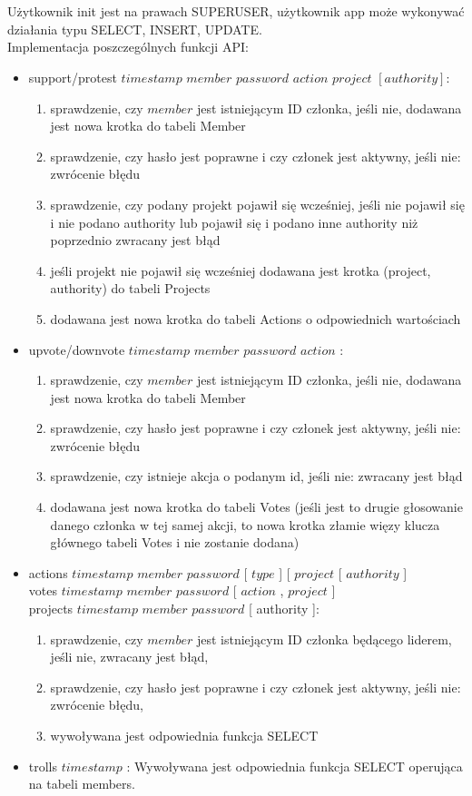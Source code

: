 \documentclass[12pt]{article}
\begin{document}
\\\\ Użytkownik init jest na prawach SUPERUSER, użytkownik app może wykonywać działania typu SELECT, INSERT, UPDATE.
\\Implementacja poszczególnych funkcji API:
\begin{itemize}
\item support/protest  $ timestamp$ $ member$ $ password$ $ action $ $project $ $[authority] $: \begin{enumerate}
\item sprawdzenie, czy  $member $  jest istniejącym ID członka, jeśli nie, dodawana jest nowa krotka do tabeli Member
\item sprawdzenie, czy hasło jest poprawne i czy członek jest aktywny, jeśli nie: zwrócenie błędu
\item sprawdzenie, czy podany projekt pojawił się wcześniej, jeśli nie pojawił się i nie podano authority lub pojawił się i podano inne authority niż poprzednio zwracany jest błąd
\item jeśli projekt nie pojawił się wcześniej dodawana jest krotka (project, authority) do tabeli Projects
\item dodawana jest nowa krotka do tabeli Actions o odpowiednich wartościach
\end{enumerate}
\item upvote/downvote  $timestamp $   $member $   $password $   $action $  :
\begin{enumerate}
\item sprawdzenie, czy  $member $  jest istniejącym ID członka, jeśli nie, dodawana jest nowa krotka do tabeli Member
\item sprawdzenie, czy hasło jest poprawne i czy członek jest aktywny, jeśli nie: zwrócenie błędu
\item sprawdzenie, czy istnieje akcja o podanym id, jeśli nie: zwracany jest błąd
\item dodawana jest nowa krotka do tabeli Votes (jeśli jest to drugie głosowanie danego członka w tej samej akcji, to nowa krotka złamie więzy klucza głównego tabeli Votes i nie zostanie dodana)
\end{enumerate}
\item actions  $timestamp $   $member $   $password $  [  $type $  ] [  $project $  [ $authority $  ] \\
votes  $timestamp $   $member $   $password $  [  $action $  ,  $project $  ]\\
projects  $timestamp $   $member $   $password $  [ authority ]: 
\begin{enumerate}
\item sprawdzenie, czy  $member $  jest istniejącym ID członka będącego liderem, jeśli nie, zwracany jest błąd,
\item sprawdzenie, czy hasło jest poprawne i czy członek jest aktywny, jeśli nie: zwrócenie błędu,
\item wywoływana jest odpowiednia funkcja SELECT
\end{enumerate}
\item trolls  $timestamp $ :
Wywoływana jest odpowiednia funkcja SELECT operująca na tabeli members. 
\end{itemize}\\
\end{document}
